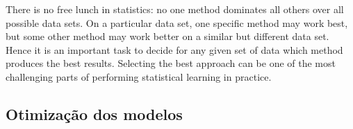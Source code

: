 		There
		is no free lunch in statistics: no one method dominates all others over all
		possible data sets. On a particular data set, one specific method may work
		best, but some other method may work better on a similar but different
		data set. Hence it is an important task to decide for any given set of data
		which method produces the best results. Selecting the best approach can
		be one of the most challenging parts of performing statistical learning in
		practice.



		\subsection{Otimização dos modelos}





